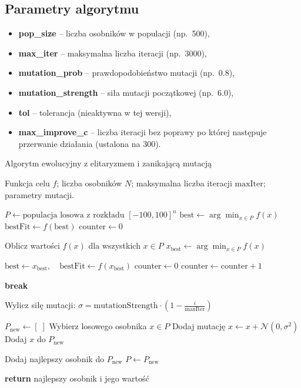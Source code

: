 \documentclass[a4paper]{article}
\begin{document}
\subsection{Parametry algorytmu}
\begin{itemize}
  \item \textbf{pop\_size} – liczba osobników w populacji (np.~500),
  \item \textbf{max\_iter} – maksymalna liczba iteracji (np.~3000),
  \item \textbf{mutation\_prob} – prawdopodobieństwo mutacji (np.~0.8),
  \item \textbf{mutation\_strength} – siła mutacji początkowej (np.~6.0),
  \item \textbf{tol} – tolerancja (nieaktywna w tej wersji),
  \item \textbf{max\_improve\_c} – liczba iteracji bez poprawy po której następuje przerwanie działania (ustalona na 300).
\end{itemize}

\begin{algorithm}[H]
\caption{Algorytm ewolucyjny z elitaryzmem i zanikającą mutacją}
\label{alg:evolutionary}
\begin{algorithmic}[1]

\REQUIRE
  Funkcja celu \(f\); liczba osobników \(N\); maksymalna liczba iteracji \(\text{maxIter}\); parametry mutacji.

\STATE \( P \leftarrow \text{populacja losowa z rozkładu } [-100, 100]^n \)
\STATE \( \text{best} \leftarrow \arg\min_{x \in P} f(x) \)
\STATE \( \text{bestFit} \leftarrow f(\text{best}) \)
\STATE \( \text{counter} \leftarrow 0 \)


  \STATE Oblicz wartości \(f(x)\) dla wszystkich \(x \in P\)
  \STATE \( x_{\text{best}} \leftarrow \arg\min_{x \in P} f(x) \)

    \STATE \( \text{best} \leftarrow x_{\text{best}},\quad \text{bestFit} \leftarrow f(x_{\text{best}}) \)
    \STATE \( \text{counter} \leftarrow 0 \)
  \ELSE
    \STATE \( \text{counter} \leftarrow \text{counter} + 1 \)
  \ENDIF

   \STATE \textbf{break} \ENDIF

  \STATE Wylicz siłę mutacji: \( \sigma = \text{mutationStrength} \cdot (1 - \tfrac{i}{\text{maxIter}}) \)

  \STATE \( P_{\text{new}} \leftarrow [\;] \)
    \STATE Wybierz losowego osobnika \( x \in P \)
      \STATE Dodaj mutację \(x \leftarrow x + \mathcal{N}(0, \sigma^2)\)
    \ENDIF
    \STATE Dodaj \(x\) do \(P_{\text{new}}\)
  \ENDFOR

  \STATE Dodaj najlepszy osobnik do \(P_{\text{new}}\)
  \STATE \( P \leftarrow P_{\text{new}} \)

\ENDFOR
\STATE \textbf{return} najlepszy osobnik i jego wartość

\end{algorithmic}
\end{algorithm}
\end{document}
